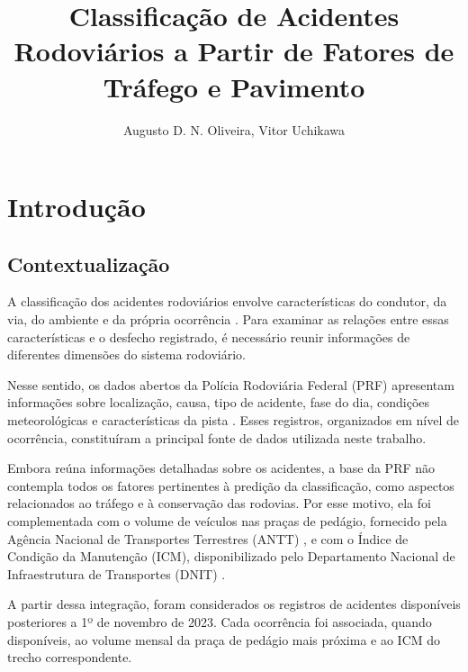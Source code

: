 \documentclass[12pt]{article}
\title{Classificação de Acidentes Rodoviários a Partir de Fatores de Tráfego e Pavimento}
\author{Augusto D. N. Oliveira\inst{1}, Vitor Uchikawa\inst{2}}
\begin{document}
 

\maketitle

\begin{abstract}
\end{abstract}
     
\begin{resumo} 
\end{resumo}

\section{Introdução}

\subsection{Contextualização}

A classificação dos acidentes rodoviários envolve características do condutor, da via, do ambiente e da própria ocorrência \cite{who2023roadsafety}. Para examinar as relações entre essas características e o desfecho registrado, é necessário reunir informações de diferentes dimensões do sistema rodoviário.

Nesse sentido, os dados abertos da Polícia Rodoviária Federal (PRF) apresentam informações sobre localização, causa, tipo de acidente, fase do dia, condições meteorológicas e características da pista \cite{prf_dados_abertos}. Esses registros, organizados em nível de ocorrência, constituíram a principal fonte de dados utilizada neste trabalho.

Embora reúna informações detalhadas sobre os acidentes, a base da PRF não contempla todos os fatores pertinentes à predição da classificação, como aspectos relacionados ao tráfego e à conservação das rodovias. Por esse motivo, ela foi complementada com o volume de veículos nas praças de pedágio, fornecido pela Agência Nacional de Transportes Terrestres (ANTT) \cite{antt_dados_abertos}, e com o Índice de Condição da Manutenção (ICM), disponibilizado pelo Departamento Nacional de Infraestrutura de Transportes (DNIT) \cite{dnit_icm}.

A partir dessa integração, foram considerados os registros de acidentes disponíveis posteriores a 1º de novembro de 2023. Cada ocorrência foi associada, quando disponíveis, ao volume mensal da praça de pedágio mais próxima e ao ICM do trecho correspondente.
\end{document}
